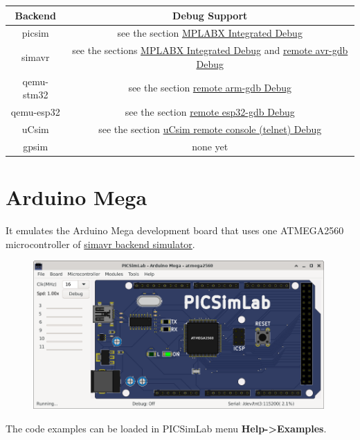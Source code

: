 \begin{center}
\begin{tabular}{c|c}
\hline \textbf{Backend} & \textbf{Debug Support}\\
\hline picsim & see the section \hyperlink{def:mplabxd}{MPLABX Integrated Debug}\\
\hline simavr & see the sections \hyperlink{def:mplabxd}{MPLABX Integrated Debug} and \hyperlink{def:gdbavr}{remote avr-gdb Debug}\\
\hline qemu-stm32 & see the section \hyperlink{def:gdbarm}{remote arm-gdb Debug}\\
\hline qemu-esp32 & see the section \hyperlink{def:gdbesp}{remote esp32-gdb Debug}\\
\hline uCsim & see the section \hyperlink{def:ucsim}{uCsim remote console (telnet) Debug}\\
\hline gpsim & none yet\\
\hline 
\end{tabular}
\end{center}


\section{Arduino Mega}

It emulates the Arduino Mega development board that uses one ATMEGA2560 microcontroller of 
\hyperlink{def:simavr}{simavr backend simulator}.

\begin{figure}[H]
\center
\includegraphics[width=0.99\textwidth]{img/boardAMega.png} 
\end{figure} 


The code examples can be loaded in PICSimLab menu \textbf{Help->Examples}.

